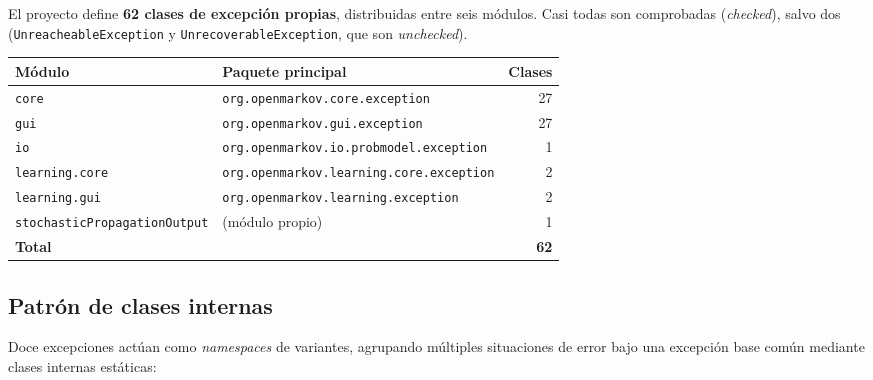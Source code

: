 \documentclass[11pt,a4paper]{article}
\begin{document}
El proyecto define \textbf{62 clases de excepción propias}, distribuidas entre seis módulos. Casi
todas son comprobadas (\textit{checked}), salvo dos (\texttt{UnreacheableException} y
\texttt{UnrecoverableException}, que son \textit{unchecked}).

\begin{longtable}{llr}
    \toprule
    \textbf{Módulo} & \textbf{Paquete principal} & \textbf{Clases} \\
    \midrule
    \texttt{core}                       & \texttt{org.openmarkov.core.exception}        & 27 \\
    \texttt{gui}                        & \texttt{org.openmarkov.gui.exception}          & 27 \\
    \texttt{io}                         & \texttt{org.openmarkov.io.probmodel.exception} &  1 \\
    \texttt{learning.core}              & \texttt{org.openmarkov.learning.core.exception}&  2 \\
    \texttt{learning.gui}               & \texttt{org.openmarkov.learning.exception}     &  2 \\
    \texttt{stochasticPropagationOutput}& (módulo propio)                               &  1 \\
    \midrule
    \textbf{Total}                      &                                               & \textbf{62} \\
    \bottomrule
\end{longtable}

\subsection{Patrón de clases internas}

Doce excepciones actúan como \emph{namespaces} de variantes, agrupando múltiples situaciones
de error bajo una excepción base común mediante clases internas estáticas:
\end{document}
